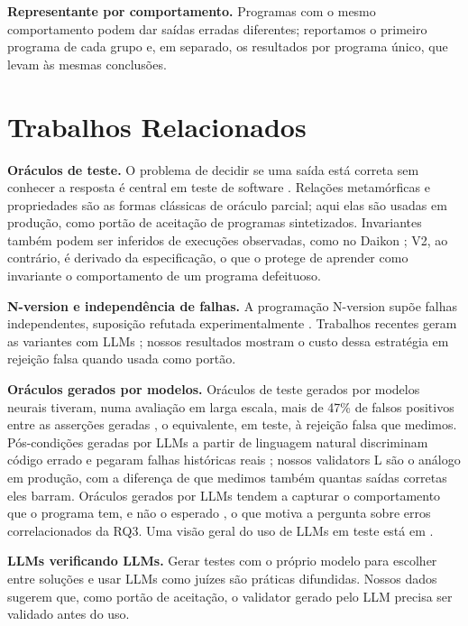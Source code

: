 \documentclass[sigconf,nonacm]{acmart}
\begin{document}
\textbf{Representante por comportamento.} Programas com o mesmo comportamento podem dar saídas erradas diferentes; reportamos o primeiro programa de cada grupo e, em separado, os resultados por programa único, que levam às mesmas conclusões.

\section{Trabalhos Relacionados}

\textbf{Oráculos de teste.} O problema de decidir se uma saída está correta sem conhecer a resposta é central em teste de software \cite{barr2015oracle}. Relações metamórficas \cite{chen1998metamorphic,segura2016survey} e propriedades \cite{claessen2000quickcheck} são as formas clássicas de oráculo parcial; aqui elas são usadas em produção, como portão de aceitação de programas sintetizados. Invariantes também podem ser inferidos de execuções observadas, como no Daikon \cite{ernst2007daikon}; V2, ao contrário, é derivado da especificação, o que o protege de aprender como invariante o comportamento de um programa defeituoso.

\textbf{N-version e independência de falhas.} A programação N-version \cite{avizienis1985nversion} supõe falhas independentes, suposição refutada experimentalmente \cite{knight1986experimental}. Trabalhos recentes geram as variantes com LLMs \cite{ron2024galapagos}; nossos resultados mostram o custo dessa estratégia em rejeição falsa quando usada como portão.

\textbf{Oráculos gerados por modelos.} Oráculos de teste gerados por modelos neurais \cite{dinella2022toga} tiveram, numa avaliação em larga escala, mais de 47\% de falsos positivos entre as asserções geradas \cite{hossain2023neural}, o equivalente, em teste, à rejeição falsa que medimos. Pós-condições geradas por LLMs a partir de linguagem natural discriminam código errado e pegaram falhas históricas reais \cite{endres2024nl2postcond}; nossos validators L são o análogo em produção, com a diferença de que medimos também quantas saídas corretas eles barram. Oráculos gerados por LLMs tendem a capturar o comportamento que o programa tem, e não o esperado \cite{konstantinou2024oracles}, o que motiva a pergunta sobre erros correlacionados da RQ3. Uma visão geral do uso de LLMs em teste está em \cite{wang2024survey}.

\textbf{LLMs verificando LLMs.} Gerar testes com o próprio modelo para escolher entre soluções \cite{chen2022codet} e usar LLMs como juízes \cite{zheng2023judging} são práticas difundidas. Nossos dados sugerem que, como portão de aceitação, o validator gerado pelo LLM precisa ser validado antes do uso.
\end{document}
